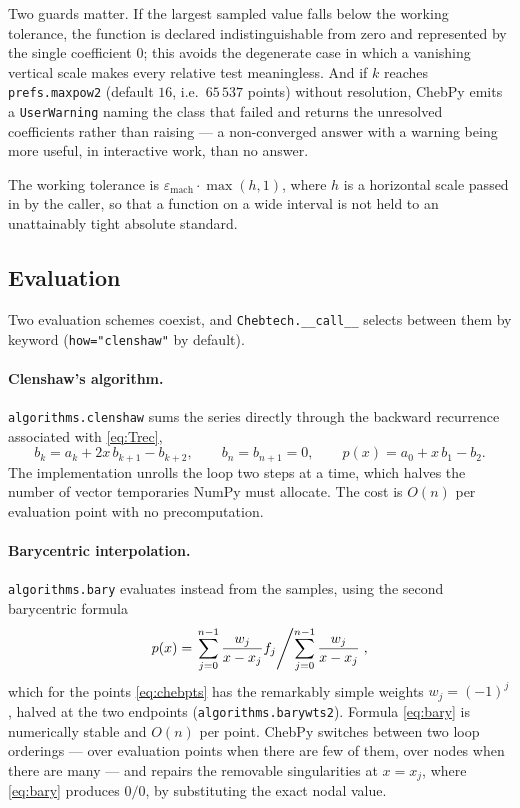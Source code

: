 \documentclass[11pt,a4paper]{article}
\newcommand{\eps}{\varepsilon_{\mathrm{mach}}}
\newcommand{\code}[1]{\texttt{#1}}
\begin{document}
Two guards matter. If the largest sampled value falls below the working
tolerance, the function is declared indistinguishable from zero and represented
by the single coefficient $0$; this avoids the degenerate case in which a
vanishing vertical scale makes every relative test meaningless. And if $k$
reaches \code{prefs.maxpow2} (default $16$, i.e.\ $65\,537$ points) without
resolution, ChebPy emits a \code{UserWarning} naming the class that failed and
returns the unresolved coefficients rather than raising --- a non-converged
answer with a warning being more useful, in interactive work, than no answer.

The working tolerance is $\eps \cdot \max(h, 1)$, where $h$ is a horizontal
scale passed in by the caller, so that a function on a wide interval is not
held to an unattainably tight absolute standard.

\subsection{Evaluation}

Two evaluation schemes coexist, and \code{Chebtech.\_\_call\_\_} selects
between them by keyword (\code{how="clenshaw"} by default).

\paragraph{Clenshaw's algorithm.}
\code{algorithms.clenshaw} sums the series directly through the backward
recurrence associated with \eqref{eq:Trec},
\begin{equation}
  b_k = a_k + 2x\,b_{k+1} - b_{k+2}, \qquad
  b_{n} = b_{n+1} = 0, \qquad
  p(x) = a_0 + x\,b_1 - b_2 .
  \label{eq:clenshaw}
\end{equation}
The implementation unrolls the loop two steps at a time, which halves the
number of vector temporaries NumPy must allocate. The cost is $O(n)$ per
evaluation point with no precomputation.

\paragraph{Barycentric interpolation.}
\code{algorithms.bary} evaluates instead from the samples, using the second
barycentric formula~\cite{berrut2004}
\begin{equation}
  p(x) = \left. \sum_{j=0}^{n-1} \frac{w_j}{x - x_j} f_j \middle/
                \sum_{j=0}^{n-1} \frac{w_j}{x - x_j} \right. ,
  \label{eq:bary}
\end{equation}
which for the points \eqref{eq:chebpts} has the remarkably simple weights
$w_j = (-1)^j$, halved at the two endpoints (\code{algorithms.barywts2}).
Formula \eqref{eq:bary} is numerically stable and $O(n)$ per point. ChebPy
switches between two loop orderings --- over evaluation points when there are
few of them, over nodes when there are many --- and repairs the removable
singularities at $x = x_j$, where \eqref{eq:bary} produces $0/0$, by
substituting the exact nodal value.
\end{document}

